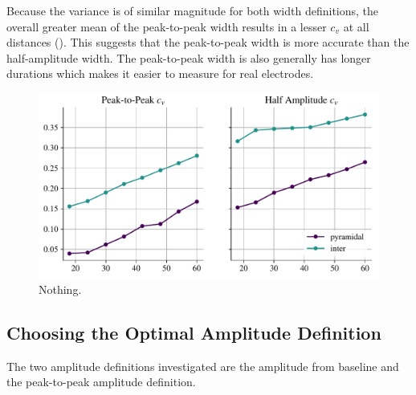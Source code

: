 \documentclass[altfont, fleqn]{uiophd}
\renewcommand{\cref}[1]{{\color{viridis_03}\mycref{#1}}}
\begin{document}
Because the variance is of similar magnitude for both width definitions, 
the overall greater mean of the peak-to-peak width results in a
lesser $c_v$ at all distances 
(\cref{fig:4_width_snr}).
This suggests that 
the peak-to-peak width
is more accurate than the half-amplitude width. 
The peak-to-peak width is also generally has longer 
durations which makes it easier to measure for real electrodes. 



\begin{figure}[h]
    \begin{center}
        \includegraphics[width=\textwidth]{images/sec_4/int_pyr_widths_snr.pdf}
        \caption{
            Nothing.
        }
        \label{fig:4_width_snr}
    \end{center}
\end{figure}



\noindent
\newpage
\subsection{Choosing the Optimal Amplitude Definition}
The two amplitude definitions investigated are
the amplitude from baseline and 
the peak-to-peak amplitude definition.
\end{document}
